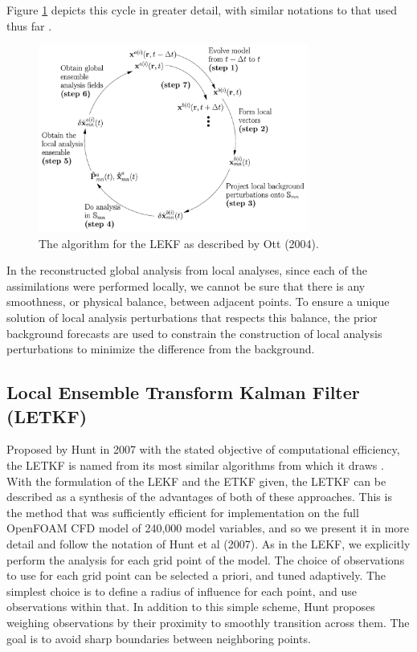 \documentclass[12pt]{report}
\begin{document}
Figure \ref{fig:ott2004algorithm} depicts this cycle in greater detail, with similar notations to that used thus far .

\begin{figure}[h!]
  \centering
  \includegraphics[width=0.79\textwidth]{figures/ott2004algorithmPic2.png}
  \caption[The algorithm for the LEKF as described by Ott (2004)]{
    The algorithm for the LEKF as described by Ott (2004).
    }
  \label{fig:ott2004algorithm}
\end{figure}

In the reconstructed global analysis from local analyses, since each of the assimilations were performed locally, we cannot be sure that there is any smoothness, or physical balance, between adjacent points.
To ensure a unique solution of local analysis perturbations that respects this balance, the prior background forecasts are used to constrain the construction of local analysis perturbations to minimize the difference from the background.

\subsection{Local Ensemble Transform Kalman Filter (LETKF)}

Proposed by Hunt in 2007 with the stated objective of computational efficiency, the LETKF is named from its most similar algorithms from which it draws .
With the formulation of the LEKF and the ETKF given, the LETKF can be  described as a synthesis of the advantages of both of these approaches.
This is the method that was sufficiently efficient for implementation on the full OpenFOAM CFD model of 240,000 model variables, and so we present it in more detail and follow the notation of Hunt et al (2007). 
As in the LEKF, we explicitly perform the analysis for each grid point of the model.
The choice of observations to use for each grid point can be selected a priori, and tuned adaptively.
The simplest choice is to define a radius of influence for each point, and use observations within that.
In addition to this simple scheme, Hunt proposes weighing observations by their proximity to smoothly transition across them.
The goal is to avoid sharp boundaries between neighboring points.
\end{document}
